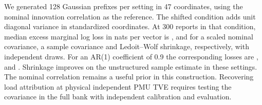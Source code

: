 We generated 128 Gaussian prefixes per setting in 47 coordinates, using
the nominal innovation correlation as the reference. The shifted
condition adds unit diagonal variance in standardized coordinates.
At 300 reports in that condition, median excess marginal log loss in
nats per vector is \CovIIDScale{}, \CovIIDSample{} and \CovIIDShrink{}
for a scaled nominal covariance, a sample covariance and Ledoit--Wolf
shrinkage, respectively, with independent draws. For an AR(1) coefficient
of 0.9 the corresponding losses are \CovARScale{}, \CovARSample{} and
\CovARShrink{}. Shrinkage improves on the unstructured sample estimate
in these settings. The nominal correlation remains a useful prior in
this construction. Recovering load attribution at physical independent
PMU TVE requires testing the covariance in the full bank with independent
calibration and evaluation.
